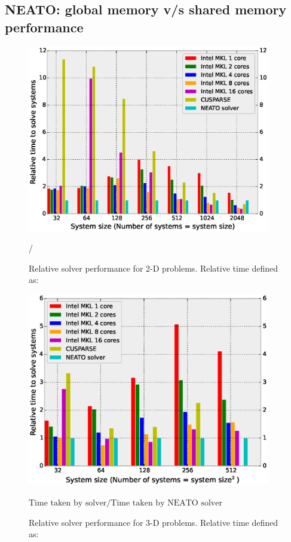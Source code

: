 \documentclass{elsarticle}
\begin{document}
\subsection{NEATO: global memory v/s shared memory performance}

\begin{figure}
\begin{center}
\includegraphics[width=300pt]{fig/bench-2d.eps}
\caption{Relative solver performance for 2-D problems. Relative time defined as:}
/
\label{fig:bench-2d}
\end{center}
\end{figure}

\begin{figure}
\begin{center}
\includegraphics[width=300pt]{fig/bench-3d.eps}
\caption{Relative solver performance for 3-D problems. Relative time defined as:}
$\text{Time taken by solver}/\text{Time taken by NEATO solver}$
\label{fig:bench-3d}
\end{center}
\end{figure}
\end{document}
